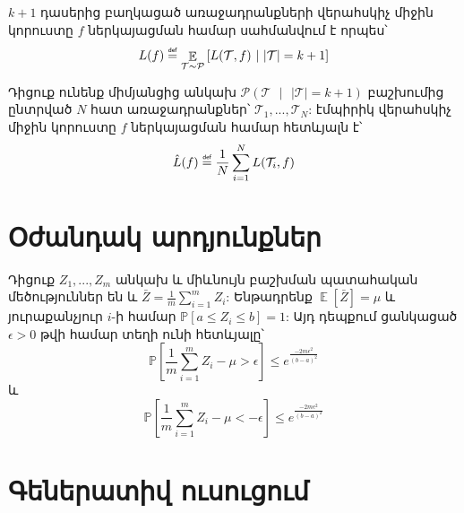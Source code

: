 \documentclass[11pt]{article}
\DeclareMathOperator*{\E}{\mathbb{E}}
\newcommand\defeq{\mathrel{\overset{\makebox[0pt]{\mbox{\normalfont\tiny\sffamily def}}}{=}}}
\begin{document}
\begin{defination}
$k+1$ դասերից բաղկացած առաջադրանքների վերահսկիչ միջին կորուստը $f$ ներկայացման համար սահմանվում է որպես՝ 
$$L(f) \defeq \E_{\mathcal{T} \sim \mathcal{P}} \left [L (\mathcal{T}, f) \text{ } | \text{ } |\mathcal{T}| = k+1\right]$$
\end{defination}

\begin{defination}
Դիցուք ունենք միմյանցից անկախ $\mathcal{P}(\mathcal{T} \text{ } |\text{ }  |\mathcal{T}| = k +1)$ բաշխումից ընտրված $N$ հատ առաջադրանքներ՝ $\mathcal{T}_1, ..., \mathcal{T}_N$:
էմպիրիկ վերահսկիչ միջին կորուստը $f$ ներկայացման համար հետևյալն է՝ 
$$\hat{L}(f) \defeq \frac{1}{N}\sum_{i=1}^{N}L (\mathcal{T}_i, f)$$
\end{defination}
\pagebreak
\section*{\hfill Օժանդակ արդյունքներ \hfill} \noindent

{}


\begin{lemma}
Դիցուք $Z_1, ..., Z_m$ անկախ և միևնույն բաշխման պատահական մեծություններ են և $\bar{Z} = \frac{1}{m}\sum_{i=1}^m{Z_i}$: Ենթադրենք $\E[\bar{Z}] = \mu$ և յուրաքանչյուր $i$-ի համար $\mathbb{P}[a \leq Z_i \leq b] = 1$: Այդ դեպքում ցանկացած $\epsilon > 0$ թվի համար տեղի ունի հետևյալը՝
$$\mathbb{P}\left[ \frac{1}{m}\sum_{i=1}^m{Z_i}-\mu > \epsilon \right] \leq e^{\frac{-2m\epsilon^2}{(b-a)^2}}$$ 
և
$$\mathbb{P}\left[ \frac{1}{m}\sum_{i=1}^m{Z_i}-\mu < -\epsilon \right] \leq e^{\frac{-2m\epsilon^2}{(b-a)^2}}$$ 
\end{lemma}

\iffalse
\section*{\hfill Գեներատիվ ուսուցում \hfill} \noindent

{}
\end{document}
